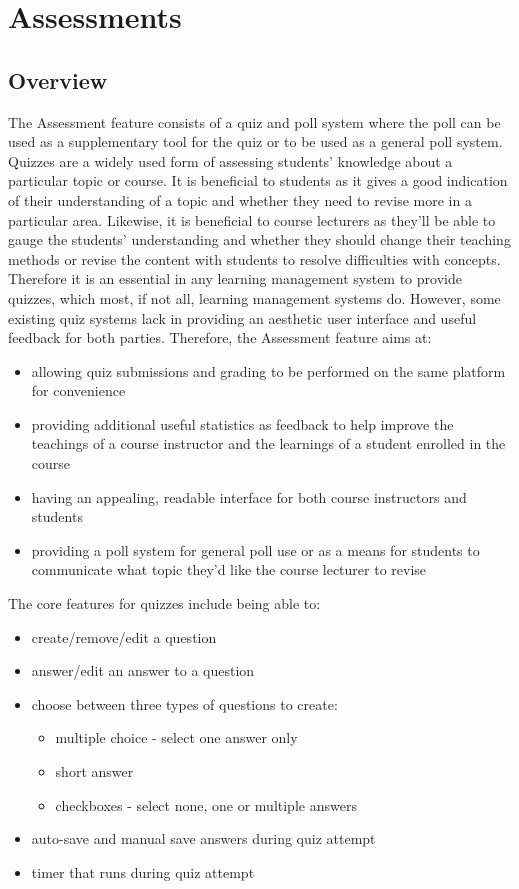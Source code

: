\section{Assessments}
\subsection{Overview}
The Assessment feature consists of a quiz and poll system where the poll can be used as a supplementary tool for the quiz or to be used as a general poll system. Quizzes are a widely used form of assessing students' knowledge about a particular topic or course. It is beneficial to students as it gives a good indication of their understanding of a topic and whether they need to revise more in a particular area. Likewise, it is beneficial to course lecturers as they'll be able to gauge the students' understanding and whether they should change their teaching methods or revise the content with students to resolve difficulties with concepts. Therefore it is an essential in any learning management system to provide quizzes, which most, if not all, learning management systems do. However, some existing quiz systems lack in providing an aesthetic user interface and useful feedback for both parties. Therefore, the Assessment feature aims at:
\begin{itemize}
    \item allowing quiz submissions and grading to be performed on the same platform for convenience
    \item providing additional useful statistics as feedback to help improve the teachings of a course instructor and the learnings of a student enrolled in the course
    \item having an appealing, readable interface for both course instructors and students
    \item providing a poll system for general poll use or as a means for students to communicate what topic they'd like the course lecturer to revise
\end{itemize}

The core features for quizzes include being able to:
\begin{itemize}
    \item create/remove/edit a question
    \item answer/edit an answer to a question
    \item choose between three types of questions to create:
    \begin{itemize}
    	\item multiple choice - select one answer only
    	\item short answer
    	\item checkboxes - select none, one or multiple answers
    \end{itemize}
    \item auto-save and manual save answers during quiz attempt
    \item timer that runs during quiz attempt
\end{itemize}

